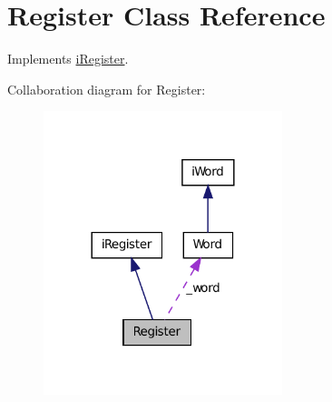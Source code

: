 \hypertarget{classRegister}{
\section{Register Class Reference}
\label{classRegister}
}


Implements \hyperlink{classiRegister}{iRegister}.  




Collaboration diagram for Register:\nopagebreak
\begin{figure}[H]
\begin{center}
\leavevmode
\includegraphics[width=197pt]{classRegister__coll__graph}
\end{center}
\end{figure}
